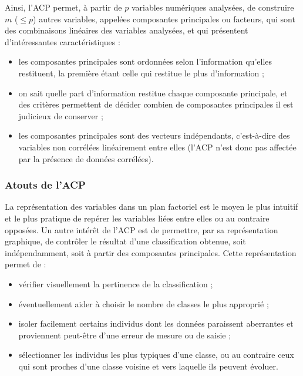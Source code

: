 \documentclass[a4paper]{report}
\begin{document}
Ainsi, l'ACP permet, à partir de $p$ variables numériques analysées, de construire $m$ ($\leq p$) autres variables, appelées composantes principales ou facteurs, qui sont des combinaisons linéaires des variables analysées, et qui présentent d'intéressantes caractéristiques : 
\begin{itemize}
\item les composantes principales sont ordonnées selon l'information qu'elles restituent, la première étant celle qui restitue le plus d'information ;
\item on sait quelle part d'information restitue chaque composante principale, et des critères permettent de décider combien de composantes principales il est judicieux de conserver ;
\item les composantes principales sont des vecteurs indépendants, c'est-à-dire des variables non corrélées linéairement entre elles (l'ACP n'est donc pas affectée par la présence de données corrélées).
\end{itemize}

\subsubsection{Atouts de l'ACP}
La représentation des variables dans un plan factoriel est le moyen le plus intuitif et le plus pratique de repérer les variables liées entre elles ou au contraire opposées.
Un autre intérêt de l'ACP est de permettre, par sa représentation graphique, de contrôler le résultat d'une classification obtenue, soit indépendamment, soit à partir des composantes principales. Cette représentation permet de :
\begin{itemize}
\item vérifier visuellement la pertinence de la classification ;
\item éventuellement aider à choisir le nombre de classes le plus approprié ;
\item isoler facilement certains individus dont les données paraissent aberrantes et proviennent peut-être d'une erreur de mesure ou de saisie ;
\item sélectionner les individus les plus typiques d'une classe, ou au contraire ceux qui sont proches d'une classe voisine et vers laquelle ils peuvent évoluer.
\end{itemize}
\end{document}
